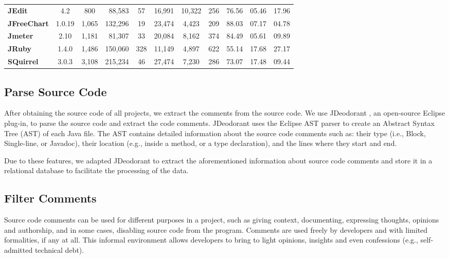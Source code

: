 \begin{table}[thb!]
\begin{center}
\begin{tabular}{l| c c r c || c c c || c c c}
            \textbf{JEdit}          & 4.2      &   800 &  88,583 & 57  & 16,991 &  10,322 &    256 &  76.56  & 05.46  & 17.96 \\
            \textbf{JFreeChart}     & 1.0.19   & 1,065 & 132,296 & 19  & 23,474 &   4,423 &    209 &  88.03  & 07.17  & 04.78 \\
            \textbf{Jmeter}         & 2.10     & 1,181 &  81,307 & 33  & 20,084 &   8,162 &    374 &  84.49  & 05.61  & 09.89 \\
            \textbf{JRuby}          & 1.4.0    & 1,486 & 150,060 & 328 & 11,149 &   4,897 &    622 &  55.14  & 17.68  & 27.17 \\ 
            \textbf{SQuirrel}       & 3.0.3    & 3,108 & 215,234 & 46  & 27,474 &   7,230 &    286 &  73.07  & 17.48  & 09.44 \\ 
            \bottomrule             
        \end{tabular}
    \end{center}
\end{table}


\subsection{Parse Source Code} %
\label{sub:parse_source_code}

After obtaining the source code of all projects, we extract the comments from the source code. We use JDeodorant \cite{Tsantalis2008CSMR}, an open-source Eclipse plug-in, to parse the source code and extract the code comments. JDeodorant uses the Eclipse AST parser to create an Abstract Syntax Tree (AST) of each Java file. The AST contains detailed information about the source code comments such as: their type (i.e., Block, Single-line, or Javadoc), their location (e.g., inside a method, or a type declaration), and the lines where they start and end. 

Due to these features, we adapted JDeodorant to extract the aforementioned information about source code comments and store it in a relational database to facilitate the processing of the data.

\subsection{Filter Comments} %
\label{sub:filter_comments}

Source code comments can be used for different purposes in a project, such as giving context, documenting, expressing thoughts, opinions and authorship, and in some cases, disabling source code from the program. Comments are used freely by developers and with limited formalities, if any at all. This informal environment allows developers to bring to light opinions, insights and even confessions (e.g., self-admitted technical debt). 

